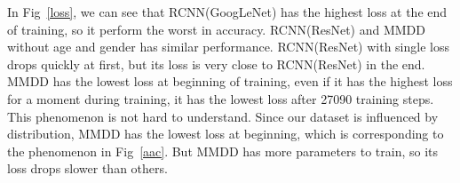 \documentclass[journal]{IEEEtran}
\begin{document}
In Fig~\ref{loss}, we can see that RCNN(GoogLeNet) has the highest loss at the end of training, so it perform the worst in accuracy. RCNN(ResNet) and MMDD without age and gender has similar performance. RCNN(ResNet) with single loss drops quickly at first, but its loss is very close to RCNN(ResNet) in the end. MMDD has the lowest loss at beginning of training, even if it has the highest loss for a moment during training, it has the lowest loss after 27090 training steps. This phenomenon is not hard to understand. Since our dataset is influenced by distribution, MMDD has the lowest loss at beginning, which is corresponding to the phenomenon in Fig~\ref{aac}. But MMDD has more parameters to train, so its loss drops slower than others.






%
%

\end{document}
